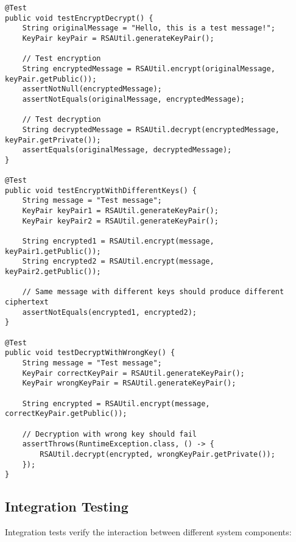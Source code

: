 \documentclass[12pt,a4paper]{article}
\begin{document}
\begin{lstlisting}[caption=RSA Encryption Unit Tests]
@Test
public void testEncryptDecrypt() {
    String originalMessage = "Hello, this is a test message!";
    KeyPair keyPair = RSAUtil.generateKeyPair();

    // Test encryption
    String encryptedMessage = RSAUtil.encrypt(originalMessage, keyPair.getPublic());
    assertNotNull(encryptedMessage);
    assertNotEquals(originalMessage, encryptedMessage);

    // Test decryption
    String decryptedMessage = RSAUtil.decrypt(encryptedMessage, keyPair.getPrivate());
    assertEquals(originalMessage, decryptedMessage);
}

@Test
public void testEncryptWithDifferentKeys() {
    String message = "Test message";
    KeyPair keyPair1 = RSAUtil.generateKeyPair();
    KeyPair keyPair2 = RSAUtil.generateKeyPair();

    String encrypted1 = RSAUtil.encrypt(message, keyPair1.getPublic());
    String encrypted2 = RSAUtil.encrypt(message, keyPair2.getPublic());

    // Same message with different keys should produce different ciphertext
    assertNotEquals(encrypted1, encrypted2);
}

@Test
public void testDecryptWithWrongKey() {
    String message = "Test message";
    KeyPair correctKeyPair = RSAUtil.generateKeyPair();
    KeyPair wrongKeyPair = RSAUtil.generateKeyPair();

    String encrypted = RSAUtil.encrypt(message, correctKeyPair.getPublic());

    // Decryption with wrong key should fail
    assertThrows(RuntimeException.class, () -> {
        RSAUtil.decrypt(encrypted, wrongKeyPair.getPrivate());
    });
}
\end{lstlisting}

\subsection{Integration Testing}

Integration tests verify the interaction between different system components:
\end{document}
